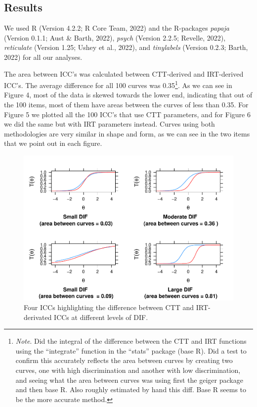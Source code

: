 \documentclass[
  man]{apa6}
\begin{document}
\hypertarget{results-1}{%
\subsection{Results}\label{results-1}}

We used R (Version 4.2.2; R Core Team, 2022) and the R-packages \emph{papaja} (Version 0.1.1; Aust \& Barth, 2022), \emph{psych} (Version 2.2.5; Revelle, 2022), \emph{reticulate} (Version 1.25; Ushey et al., 2022), and \emph{tinylabels} (Version 0.2.3; Barth, 2022) for all our analyses.

The area between ICC's was calculated between CTT-derived and IRT-derived ICC's. The average difference for all 100 curves was 0.35\footnote{\emph{Note}. Did the integral of the difference between the CTT and IRT functions using the ``integrate'' function in the ``stats'' package (base R). Did a test to confirm this accurately reflects the area between curves by creating two curves, one with high discrimination and another with low discrimination, and seeing what the area between curves was using first the geiger package and then base R. Also roughly estimated by hand this diff. Base R seems to be the more accurate method.}. As we can see in Figure 4, most of the data is skewed towards the lower end, indicating that out of the 100 items, most of them have areas between the curves of less than 0.35.
For Figure 5 we plotted all the 100 ICC's that use CTT parameters, and for Figure 6 we did the same but with IRT parameters instead. Curves using both methodologies are very similar in shape and form, as we can see in the two items that we point out in each figure.

\begin{figure}
\centering
\includegraphics{ICC_project_files/figure-latex/plotting-1.pdf}
\caption{\label{fig:plotting}Four ICCs highlighting the difference between CTT and IRT-derivated ICCs at different levels of DIF.}
\end{figure}
\end{document}
